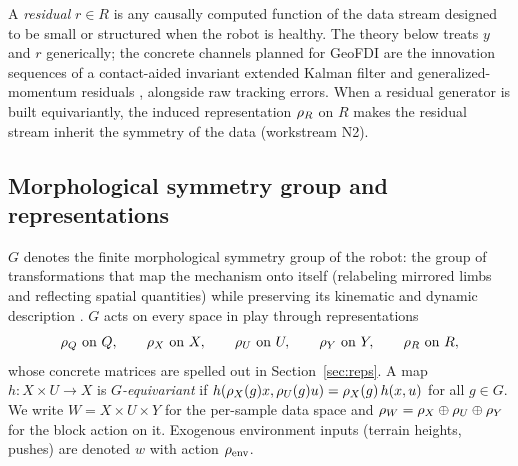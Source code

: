 A \emph{residual} $r \in R$ is any causally computed function of the data
stream designed to be small or structured when the robot is healthy. The
theory below treats $y$ and $r$ generically; the concrete channels planned for
GeoFDI are the innovation sequences of a contact-aided invariant extended
Kalman filter \cite{hartley2020contact,barrau2017invariant} and
generalized-momentum residuals \cite{evangelisti2024datadriven}, alongside raw
tracking errors. When a residual generator is built equivariantly, the induced
representation $\rho_{R}$ on $R$ makes the residual stream inherit the symmetry
of the data (workstream N2).

\subsection{Morphological symmetry group and representations}
\label{sec:group}

$G$ denotes the finite morphological symmetry group of the robot: the group of
transformations that map the mechanism onto itself (relabeling mirrored limbs
and reflecting spatial quantities) while preserving its kinematic and dynamic
description \cite{ordonez2023discrete,ordonez2025morphological}. $G$ acts on
every space in play through representations
\[
  \rho_{Q} \text{ on } Q,\qquad
  \rho_{X} \text{ on } X,\qquad
  \rho_{U} \text{ on } U,\qquad
  \rho_{Y} \text{ on } Y,\qquad
  \rho_{R} \text{ on } R,
\]
whose concrete matrices are spelled out in Section~\ref{sec:reps}. A map
$h : X \times U \to X$ is \emph{$G$-equivariant} if
$h(\rho_{X}(g)x, \rho_{U}(g)u) = \rho_{X}(g)\,h(x,u)$ for all $g \in G$. We write
$W = X \times U \times Y$ for the per-sample data space and
$\rho_{W} = \rho_{X} \oplus \rho_{U} \oplus \rho_{Y}$ for the block action on it.
Exogenous environment inputs (terrain heights, pushes) are denoted
$w$ with action $\rho_{\mathrm{env}}$.

